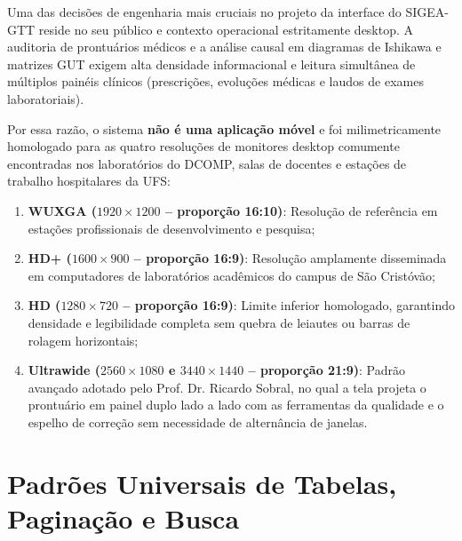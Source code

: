 Uma das decisões de engenharia mais cruciais no projeto da interface do SIGEA-GTT reside no seu público e contexto operacional estritamente desktop. A auditoria de prontuários médicos e a análise causal em diagramas de Ishikawa e matrizes GUT exigem alta densidade informacional e leitura simultânea de múltiplos painéis clínicos (prescrições, evoluções médicas e laudos de exames laboratoriais).

Por essa razão, o sistema \textbf{não é uma aplicação móvel} e foi milimetricamente homologado para as quatro resoluções de monitores desktop comumente encontradas nos laboratórios do DCOMP, salas de docentes e estações de trabalho hospitalares da UFS:
\begin{enumerate}
    \item \textbf{WUXGA ($1920 \times 1200$ -- proporção 16:10)}: Resolução de referência em estações profissionais de desenvolvimento e pesquisa;
    \item \textbf{HD+ ($1600 \times 900$ -- proporção 16:9)}: Resolução amplamente disseminada em computadores de laboratórios acadêmicos do campus de São Cristóvão;
    \item \textbf{HD ($1280 \times 720$ -- proporção 16:9)}: Limite inferior homologado, garantindo densidade e legibilidade completa sem quebra de leiautes ou barras de rolagem horizontais;
    \item \textbf{Ultrawide ($2560 \times 1080$ e $3440 \times 1440$ -- proporção 21:9)}: Padrão avançado adotado pelo Prof. Dr. Ricardo Sobral, no qual a tela projeta o prontuário em painel duplo lado a lado com as ferramentas da qualidade e o espelho de correção sem necessidade de alternância de janelas.
\end{enumerate}

\section{Padrões Universais de Tabelas, Paginação e Busca}
\label{sec_padroes_tabelas}

